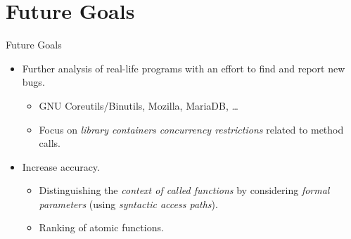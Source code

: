 \documentclass[%
    10pt, xcolor=pdflatex, hyperref={unicode}, aspectratio=169%
]{beamer}
\begin{document}
\section{Future Goals}
\begin{frame}{Future Goals}
    \begin{itemize}\setlength\itemsep{3em}
        \item
            Further analysis of \alert{real-life programs} with
            an effort to find and report \alert{new bugs}.

            \smallskip

            \begin{itemize}\setlength\itemsep{1em}
                \item
                    GNU Coreutils/Binutils, Mozilla, MariaDB, \ldots

                \item
                    Focus on \emph{library containers concurrency
                    restrictions} related to method calls.
            \end{itemize}

        \item
            Increase \alert{accuracy}.

            \smallskip

            \begin{itemize}\setlength\itemsep{1em}
                \item
                    Distinguishing the \emph{context of called
                    functions} by considering \emph{formal parameters}
                    (using \emph{syntactic access paths}).

                \item
                    \alert{Ranking} of atomic functions.
            \end{itemize}
    \end{itemize}
\end{frame}
\end{document}

